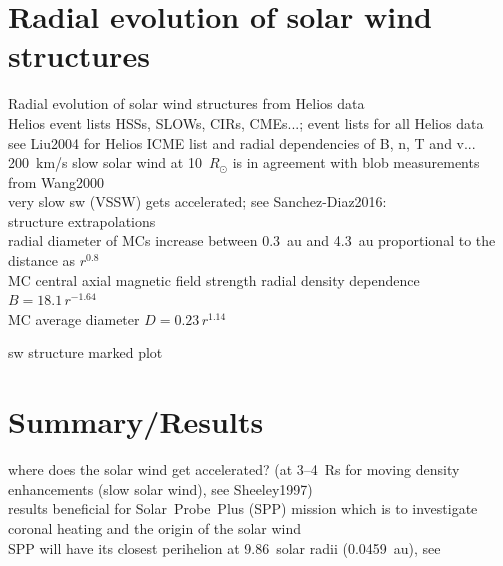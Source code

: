 \section{Radial evolution of solar wind structures}

Radial evolution of solar wind structures from Helios data\\

Helios event lists HSSs, SLOWs, CIRs, CMEs...; event lists for all Helios data\\
see Liu2004 for Helios ICME list and radial dependencies of B, n, T and v...\\

200~km/s slow solar wind at 10~$R_\odot$ is in agreement with blob measurements from Wang2000\\

very slow sw (VSSW) gets accelerated; see Sanchez-Diaz2016:\\

structure extrapolations\\

radial diameter of MCs increase between 0.3~au and 4.3~au proportional to the distance as $r^{0.8}$ \citep{Bothmer1998}\\

MC central axial magnetic field strength radial density dependence $B = 18.1\,r^{-1.64}$ \citet{Leitner2007}\\
MC average diameter $D = 0.23\,r^{1.14}$ \citet{Leitner2007}

sw structure marked plot\\


\section{Summary/Results}
where does the solar wind get accelerated? (at 3--4~Rs for moving density enhancements (slow solar wind), see Sheeley1997)\\
results beneficial for Solar~Probe~Plus (SPP) mission which is to investigate coronal heating and the origin of the solar wind\\
SPP will have its closest perihelion at 9.86~solar radii (0.0459~au), see \citet{Fox2015}\\
